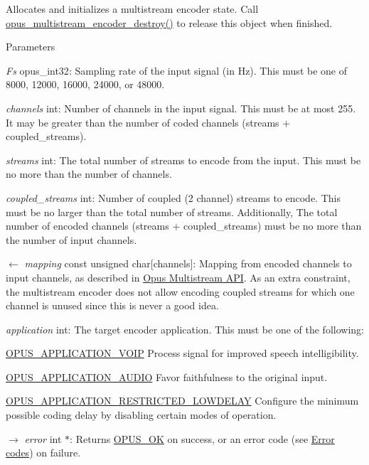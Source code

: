 Allocates and initializes a multistream encoder state. Call \hyperlink{group__opus__multistream_gaec819b8d4b38350aba6959cee7d33f94}{opus\_\-multistream\_\-encoder\_\-destroy()} to release this object when finished. 
\begin{DoxyParams}{Parameters}
\item[{\em Fs}]{\ttfamily opus\_\-int32}: Sampling rate of the input signal (in Hz). This must be one of 8000, 12000, 16000, 24000, or 48000. \item[{\em channels}]{\ttfamily int}: Number of channels in the input signal. This must be at most 255. It may be greater than the number of coded channels ({\ttfamily streams + coupled\_\-streams}). \item[{\em streams}]{\ttfamily int}: The total number of streams to encode from the input. This must be no more than the number of channels. \item[{\em coupled\_\-streams}]{\ttfamily int}: Number of coupled (2 channel) streams to encode. This must be no larger than the total number of streams. Additionally, The total number of encoded channels ({\ttfamily streams + coupled\_\-streams}) must be no more than the number of input channels. \item[\mbox{$\leftarrow$} {\em mapping}]{\ttfamily const unsigned char\mbox{[}channels\mbox{]}}: Mapping from encoded channels to input channels, as described in \hyperlink{group__opus__multistream}{Opus Multistream API}. As an extra constraint, the multistream encoder does not allow encoding coupled streams for which one channel is unused since this is never a good idea. \item[{\em application}]{\ttfamily int}: The target encoder application. This must be one of the following: 
\begin{DoxyDescription}
\item[\hyperlink{group__opus__ctlvalues_ga07884aa018303a419d1f7acb2f3fa669}{OPUS\_\-APPLICATION\_\-VOIP} ]Process signal for improved speech intelligibility. 
\item[\hyperlink{group__opus__ctlvalues_ga5909f7cb35c04f1110026c6889edd345}{OPUS\_\-APPLICATION\_\-AUDIO} ]Favor faithfulness to the original input. 
\item[\hyperlink{group__opus__ctlvalues_ga592232fb39db60c1369989c5c5d19a07}{OPUS\_\-APPLICATION\_\-RESTRICTED\_\-LOWDELAY} ]Configure the minimum possible coding delay by disabling certain modes of operation. 
\end{DoxyDescription}\item[\mbox{$\rightarrow$} {\em error}]{\ttfamily int $\ast$}: Returns \hyperlink{group__opus__errorcodes_gaa44cf8a185e1b5cb940ef63eb4f02d21}{OPUS\_\-OK} on success, or an error code (see \hyperlink{group__opus__errorcodes}{Error codes}) on failure. \end{DoxyParams}
